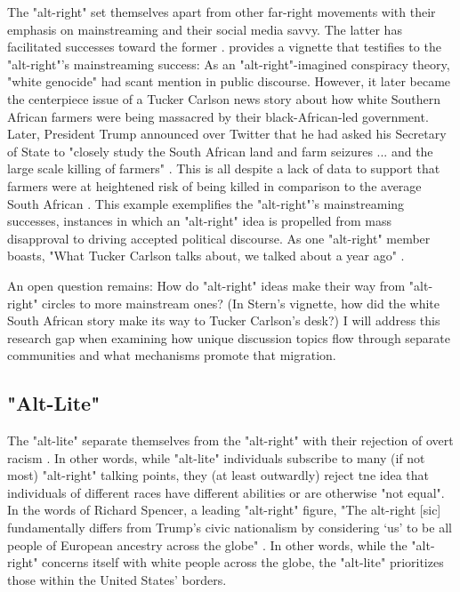 \documentclass[acmlarge, screen, authorversion]{acmart}
\begin{document}
The "alt-right" set themselves apart from other far-right movements with their emphasis on mainstreaming and their social media savvy. The latter has facilitated successes toward the former \cite{sternProudBoysWhite2019, nagleKillAllNormies2017, gallaherMainstreamingWhiteSupremacy2020}. 
\citet{sternProudBoysWhite2019} provides a vignette that testifies to the "alt-right"'s mainstreaming success: As an "alt-right"-imagined conspiracy theory, "white genocide" had scant mention in public discourse. However, it later became the centerpiece issue of a Tucker Carlson news story about how white Southern African farmers were being massacred by their black-African-led government. Later, President Trump announced over Twitter that he had asked his Secretary of State to "closely study the South African land and farm seizures ... and the large scale killing of farmers" \cite{colindwyerHereStoryThat2018}. This is all despite a lack of data to support that farmers were at heightened risk of being killed in comparison to the average South African \cite{SARejectsTrump2018}. This example exemplifies the "alt-right"'s mainstreaming successes, instances in which an "alt-right" idea is propelled from mass disapproval to driving accepted political discourse. As one "alt-right" member boasts, "What Tucker Carlson talks about, we talked about a year ago" \cite{janetreitmanLawEnforcementFailed2018}. 

An open question remains: How do "alt-right" ideas make their way from "alt-right" circles to more mainstream ones? (In Stern's vignette, how did the white South African story make its way to Tucker Carlson's desk?) I will address this research gap when examining how unique discussion topics flow through separate communities and what mechanisms promote that migration. 

\subsection{"Alt-Lite"}

The "alt-lite" separate themselves from the "alt-right" with their
rejection of overt racism \cite{anti-defamationleagueAltRightAlt, mainRiseAltRight2018, hawleyMakingSenseAltright2017}. In other words, while "alt-lite" individuals subscribe
to many (if not most) "alt-right" talking points, they (at least
outwardly) reject tne idea that individuals of different races have different
abilities or are otherwise "not equal". In the words of Richard
Spencer, a leading "alt-right" figure, "The alt-right [sic] fundamentally
differs from Trump’s civic nationalism by considering ‘us’ to be all
people of European ancestry across the globe" \cite{anti-defamationleagueAltRightAlt, mainRiseAltRight2018}. In other words, while the "alt-right" concerns
itself with white people across the globe, the "alt-lite" prioritizes
those within the United States’ borders.
\end{document}
